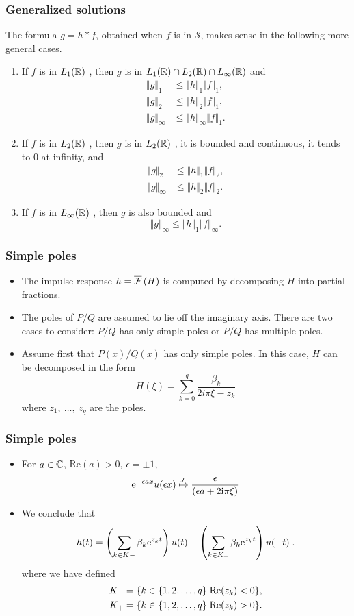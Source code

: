 \begin{frame}
\frametitle{Generalized solutions}
The formula $g=h*f$, obtained when $f$ is in $\mathcal{S}$, makes sense in the following more general cases.
\begin{enumerate}[label=(\roman*)]
\item If $f$ is in $L_1(\mathbb{R})$ , then $g$ is in $L_1(\mathbb{R})\cap L_2(\mathbb{R})\cap L_\infty(\mathbb{R})$  and
\begin{align*}
\Vert g\Vert_{1}\ &\leq\Vert h\Vert_{1}\Vert f\Vert_{1}, \\
\Vert g\Vert_{2}\ &\leq\Vert h\Vert_{2}\Vert f\Vert_{1}, \\
\Vert g\Vert_{\infty} &\leq\Vert h\Vert_{\infty}\Vert f\Vert_{1}.
\end{align*}
\item If $f$ is in $L_2(\mathbb{R})$ , then $g$ is in $L_2(\mathbb{R})$ , it is bounded and continuous, it tends to $0$ at infinity, and
\begin{align*}
\Vert g\Vert_{2}\ &\leq\Vert h\Vert_{1}\Vert f\Vert_{2}, \\
\Vert g\Vert_{\infty}& \leq \Vert h\Vert_{2}\Vert f\Vert_{2}.
\end{align*}
\item If $f$ is in $L_\infty(\mathbb{R})$ , then $g$ is also bounded and 
$$
\Vert g\Vert_{\infty}\leq\Vert h\Vert_{1}\Vert f\Vert_{\infty}.
$$
\end{enumerate}
\end{frame}

\begin{frame}
\frametitle{Simple poles}
\begin{itemize}
\item The impulse response $h=\overline{\mathcal{F}}\left( H \right)$ is computed by decomposing $H$ into partial fractions. 
\item The poles of $P/Q$ are assumed to lie off the imaginary axis. There are two cases to consider: $P/Q$ has only simple poles or $P/Q$ has multiple poles.
\item Assume first that $P(x)/Q(x)$ has only simple poles. In this case, $H$ can be decomposed in the form
$$
H(\xi)=\sum_{k=0}^{q}\frac{\beta_{k}}{2i\pi\xi-z_{k}}
$$
where $z_{1},\ \ldots,\ z_{q}$ are the poles. 
\end{itemize}
\end{frame}

\begin{frame}
\frametitle{Simple poles}
\begin{itemize}
\item For $a \in \mathbb{C}$, $\mathrm{Re}(a) > 0$, $\epsilon= \pm 1$,
\[
\mathrm{e}^{-\epsilon a x} u(\epsilon x) \stackrel{\mathcal{F}}{\mapsto} \frac{\epsilon}{(\epsilon a + 2 \mathrm{i} \pi \xi)}
\]
\item We conclude that
$$
h(t)=\left(\sum_{k\in K-}\beta_{k} \mathrm{e}^{z_{k}t} \right)u(t)- \left(\sum_{k\in K_{+}}\beta_{k} \mathrm{e}^{z_{k}t} \right)u(-t) \;.
$$
where we have defined
\begin{align*}
K_{-} &=\{k\in\{1,2,\ldots,q\}|{\rm Re}(z_{k})<0\}, \\
K_{+} &=\{k\in\{1,2,\ldots,q\}|{\rm Re}(z_{k})>0\}.
\end{align*}
\end{itemize}
\end{frame}

